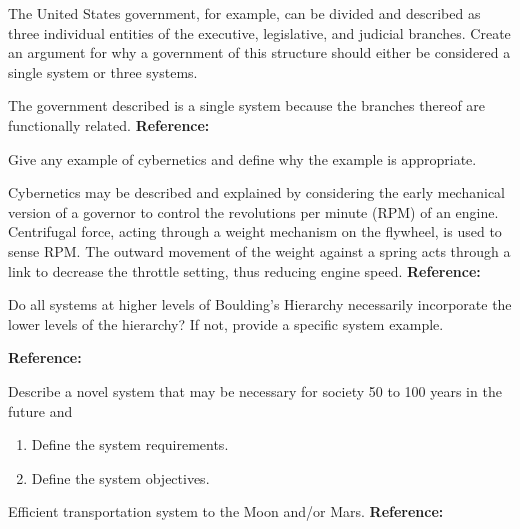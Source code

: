 \begin{exercises}
    \begin{exercise} 
    \label{sea-1-17}
        The United States government, for example, can be divided and described as three individual entities of the executive, legislative, and judicial branches. Create an argument for why a government of this structure should either be considered a single system or three systems.
    \end{exercise}
    \begin{solution}
        The government described is a single system because the branches thereof are functionally related. \textbf{Reference:}
    \end{solution}
    
    \begin{exercise} 
    \label{sea-1-19}
        Give any example of cybernetics and define why the example is appropriate.
    \end{exercise}
    \begin{solution}
        Cybernetics may be described and explained by considering the early mechanical version of a governor to control the revolutions per minute (RPM) of an engine. Centrifugal force, acting through a weight mechanism on the flywheel, is used to sense RPM. The outward movement of the weight against a spring acts through a link to decrease the throttle setting, thus reducing engine speed. \textbf{Reference:}
    \end{solution}
    
    \begin{exercise} 
    \label{sea-1-21}
        Do all systems at higher levels of Boulding's Hierarchy necessarily incorporate the lower levels of the hierarchy? If not, provide a specific system example.
    \end{exercise}
    \begin{solution}
        \textbf{Reference:}
    \end{solution}
    
    \begin{exercise} 
    \label{sea-1-22}
        Describe a novel system that may be necessary for society 50 to 100 years in the future and
        \begin{enumerate}[label=\alph*)]
            \item Define the system requirements.
            \item Define the system objectives.
        \end{enumerate}
    \end{exercise}
    \begin{solution}
        Efficient transportation system to the Moon and/or Mars. \textbf{Reference:}
    \end{solution}
    

\end{exercises}
